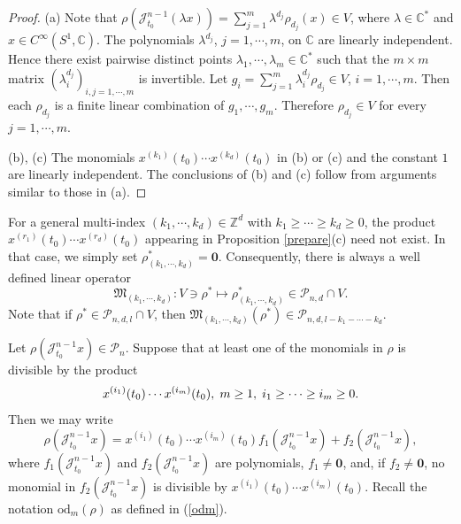 \documentclass[11pt]{amsart}
\numberwithin{equation}{section}
\newcommand{\di}{\displaystyle}
\newcommand{\bc}{\mathbb{C}}
\newcommand{\bz}{\mathbb{Z}}
\newcommand{\sd}{\mathrm{od}}
\newcommand{\scp}{\mathscr{P}}
\newcommand{\sjm}{\mathscr{J}^{n-1}_{t_0}}
\newcommand{\cisoc}{C^{\infty}\left(S^1, \mathbb{C} \right)}
\newcommand{\pn}{\mathscr{P}_{n}}
\newcommand{\pnd}{\mathscr{P}_{n, d}}
\newcommand{\pndl}{\mathscr{P}_{n, d, l}}
\newcommand{\zero}{\mathbf{0}}
\begin{document}
\begin{proof}
(a) Note that
  $\rho(\sjm (\lambda x))
    =\sum_{j=1}^m \lambda^{d_j} \rho_{d_j}(x) \in V$,
  where $\lambda \in \bc^{\ast}$ and $x \in \cisoc$. The polynomials
  $\lambda^{d_j}$, $j=1,\cdots,m$, on $\bc$ are linearly independent.
  Hence there exist pairwise distinct points
  $\lambda_1,\cdots,\lambda_m \in \bc^{\ast}$ such that the
  $m \times m$ matrix
  $(\lambda_i^{d_j})_{i,j=1,\cdots,m}$ is invertible.
  Let
  $g_i=\sum_{j=1}^m \lambda^{d_j}_i \rho_{d_j} \in V$,
    $i=1,\cdots, m$.
  Then each $\rho_{d_j}$ is a finite linear combination of
  $g_1,\cdots,g_m$. Therefore $\rho_{d_j} \in V$ for every
  $j=1,\cdots,m$.

  (b), (c) The monomials
  $x^{(k_1)}(t_0) \cdots x^{(k_d)}(t_0)$ in (b) or (c) and the constant $1$ are linearly
  independent. The conclusions of (b) and (c) follow from arguments
  similar to those in (a).
\end{proof}

For a general multi-index $(k_1,\cdots,k_d) \in \bz^d$ with
$k_1 \ge \cdots \ge k_d \ge 0$, the product
$x^{(r_1)}(t_0) \cdots x^{(r_d)}(t_0)$ appearing in
Proposition \ref{prepare}(c) need not exist. In that case, we simply
set $\rho^{\ast}_{(k_1,\cdots,k_d)}=\zero$. Consequently, there is always
a well defined linear operator
\begin{equation} \label{mul}
  \mathfrak{M}_{(k_1,\cdots,k_d)}: V \ni \rho^{\ast}
  \mapsto \rho^{\ast}_{(k_1,\cdots,k_d)} \in \pnd \cap V.
\end{equation}
Note that if $\rho^{\ast} \in \pndl \cap V$, then $\mathfrak{M}_{(k_1,\cdots,k_d)}(\rho^{\ast}) \in \scp_{n, d, l-k_1-\cdots-k_d}$.

Let $\rho(\sjm x) \in \pn$. Suppose that at least one of the monomials in $\rho$ is divisible by the product
$$
\di x^{(i_1)}(t_0) \cdots x^{(i_m)}(t_0), \hspace{1mm}  m \ge 1, \hspace{1mm}  i_1  \ge \cdots \ge i_m \ge 0.
$$
Then we may write
\begin{equation} \label{decomp}
\rho(\sjm x)= x^{(i_1)}(t_0) \cdots x^{(i_m)}(t_0) f_1(\sjm x)+f_2(\sjm x),
\end{equation}
where $f_1(\sjm x)$ and $f_2(\sjm x)$ are polynomials, $f_1 \neq \zero$, and, if $f_2 \neq \zero$, no monomial in $f_2(\sjm x)$ is divisible by $\di x^{(i_1)}(t_0) \cdots x^{(i_m)}(t_0)$.
Recall the notation $\sd_m(\rho)$ as defined in (\ref{odm}).
\end{document}
